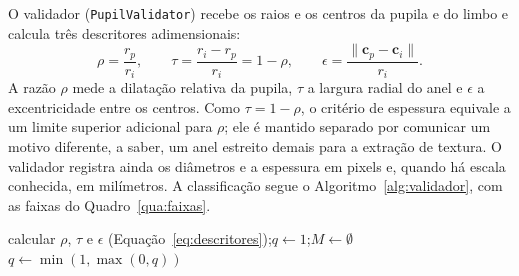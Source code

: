 \documentclass[12pt, oneside, a4paper, chapter=TITLE, section=TITLE,
               english, brazil]{abntex2}
\begin{document}
O validador (\texttt{PupilValidator}) recebe os raios e os centros da pupila
e do limbo e calcula três descritores adimensionais:
\begin{equation}
  \rho = \frac{r_p}{r_i},
  \qquad
  \tau = \frac{r_i - r_p}{r_i} = 1 - \rho,
  \qquad
  \epsilon = \frac{\|\mathbf{c}_p - \mathbf{c}_i\|}{r_i}.
  \label{eq:descritores}
\end{equation}
A razão $\rho$ mede a dilatação relativa da pupila, $\tau$ a largura radial do
anel e $\epsilon$ a excentricidade entre os centros. Como $\tau = 1 - \rho$, o
critério de espessura equivale a um limite superior adicional para $\rho$; ele
é mantido separado por comunicar um motivo diferente, a saber, um anel
estreito demais para a extração de textura. O validador registra ainda os
diâmetros e a espessura em pixels e, quando há escala conhecida, em
milímetros. A classificação segue o Algoritmo~\ref{alg:validador}, com as
faixas do Quadro~\ref{qua:faixas}.

\begin{algorithm}[H]
  \caption{Validação geométrica da pupila}
  \label{alg:validador}
  calcular $\rho$, $\tau$ e $\epsilon$ (Equação~\ref{eq:descritores});\quad $q \leftarrow 1$;\quad $M \leftarrow \emptyset$\;
  $q \leftarrow \min(1, \max(0, q))$\;
  \;
\end{algorithm}
\end{document}
